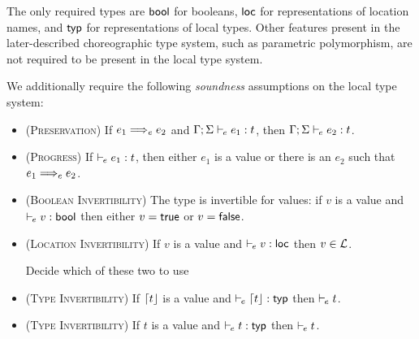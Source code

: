 The only required types are $\mathsf{bool}$ for booleans, $\mathsf{loc}$ for representations of location names, and $\mathsf{typ}$ for representations of local types.
Other features present in the later-described choreographic type system, such as parametric polymorphism, are not required to be present in the local type system.

\label{sec:sound-type-systems}
We additionally require the following \emph{soundness} assumptions on the local type system:
\begin{itemize}
	\item (\textsc{Preservation}) If $e_1 \localstep e_2$ and $\Gamma;\Sigma \vdash_{\mkern-2mu e} e_1 : t$, then $\Gamma;\Sigma \vdash_{\mkern-2mu e} e_2 : t$.

	\item (\textsc{Progress}) If $\vdash_{\mkern-2mu e} e_1 : t$, then either $e_1$ is a value or there is an $e_2$ such that $e_1 \localstep e_2$.

	\item (\textsc{Boolean Invertibility}) The type \Bool is invertible for values: if $v$ is a value and $\vdash_{\mkern-2mu e} v : \mathsf{bool}$ then either $v = \mathsf{true}$ or $v = \mathsf{false}$.

	\item (\textsc{Location Invertibility}) If $v$ is a value and $\vdash_{\mkern-2mu e} v : \mathsf{loc}$ then $v \in \mathcal{L}$.

  \todo Decide which of these two to use
  
	\item (\textsc{Type Invertibility}) If $\lceil t\rfloor$ is a value and $\vdash_{\mkern-2mu e} \lceil t\rfloor : \mathsf{typ}$ then $\vdash_{\mkern-2mu e} t$.

 	\item (\textsc{Type Invertibility}) If $t$ is a value and $\vdash_{\mkern-2mu e} t : \mathsf{typ}$ then $\vdash_{\mkern-2mu e} t$.
\end{itemize}

